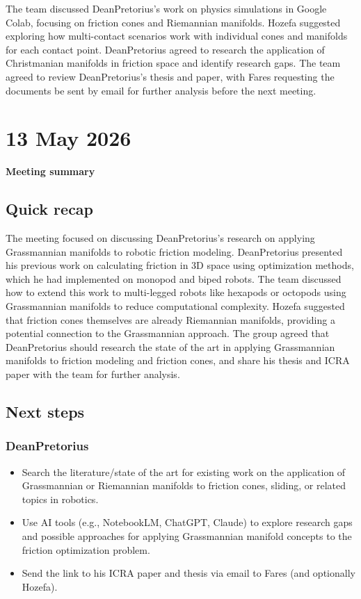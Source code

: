 The team discussed DeanPretorius's work on physics simulations in Google Colab, focusing on friction cones and Riemannian manifolds. Hozefa suggested exploring how multi-contact scenarios work with individual cones and manifolds for each contact point. DeanPretorius agreed to research the application of Christmanian manifolds in friction space and identify research gaps. The team agreed to review DeanPretorius's thesis and paper, with Fares requesting the documents be sent by email for further analysis before the next meeting.

 
\section{13 May 2026}

\textbf{Meeting summary }

\subsection{Quick recap}

The meeting focused on discussing DeanPretorius's research on applying Grassmannian manifolds to robotic friction modeling. DeanPretorius presented his previous work on calculating friction in 3D space using optimization methods, which he had implemented on monopod and biped robots. The team discussed how to extend this work to multi-legged robots like hexapods or octopods using Grassmannian manifolds to reduce computational complexity. Hozefa suggested that friction cones themselves are already Riemannian manifolds, providing a potential connection to the Grassmannian approach. The group agreed that DeanPretorius should research the state of the art in applying Grassmannian manifolds to friction modeling and friction cones, and share his thesis and ICRA paper with the team for further analysis.

\subsection{Next steps}

\subsubsection{DeanPretorius}

\begin{itemize}
    \item Search the literature/state of the art for existing work on the application of Grassmannian or Riemannian manifolds to friction cones, sliding, or related topics in robotics.
    \item Use AI tools (e.g., NotebookLM, ChatGPT, Claude) to explore research gaps and possible approaches for applying Grassmannian manifold concepts to the friction optimization problem.
    \item Send the link to his ICRA paper and thesis via email to Fares (and optionally Hozefa).
\end{itemize}

